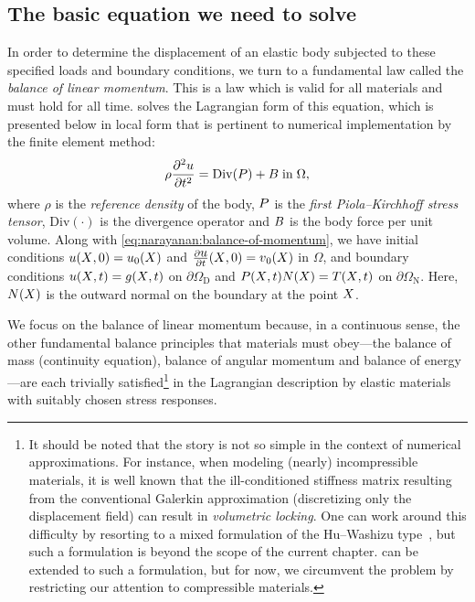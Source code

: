 \subsection{The basic equation we need to solve}

In order to determine the displacement of an elastic body subjected to
these specified loads and boundary conditions, we turn to a
fundamental law called the {\em balance of linear momentum}. This is a
law which is valid for all materials and must hold for all
time. \twist{} solves the Lagrangian form of this equation, which is
presented below in local form that is pertinent to numerical
implementation by the finite element method:
\begin{align}
  \rho \frac{\partial^{2} \mbox{$ u$}}{\partial t^{2}} = \mathrm{Div}(\mbox{$ P$})
  + \mbox{$ B$}\; \mathrm{in}\; \Omega,
  \label{eq:narayanan:balance-of-momentum}
\end{align}
where $\rho$ is the {\em reference density} of the body, $\mbox{$ P$}$ is the
{\em first Piola--Kirchhoff stress tensor}, $\mathrm{Div} (\cdot)$ is
the divergence operator and $\mbox{$ B$}$ is the body force per unit
volume. Along with \eqref{eq:narayanan:balance-of-momentum}, we have
initial conditions $\mbox{$ u$}(\mbox{$ X$}, 0) = \mbox{$ u$}_{0}(\mbox{$ X$})$ and
$\frac{\partial\mbox{$ u$}}{\partial t}(\mbox{$ X$}, 0) = \mbox{$ v$}_{0}(\mbox{$ X$})$ in $\Omega$,
and boundary conditions $\mbox{$ u$}(\mbox{$ X$}, t) = \mbox{$ g$}(\mbox{$ X$}, t)$ on
$\partial\Omega_{\mathrm{D}}$ and $\mbox{$ P$}(\mbox{$ X$}, t) \mbox{$ N$}(\mbox{$ X$}) = \mbox{$ T$}(\mbox{$ X$}, t)$
on $\partial\Omega_{\mathrm{N}}$. Here, $\mbox{$ N$}(X)$ is the outward normal
on the boundary at the point $\mbox{$ X$}$.

We focus on the balance of linear momentum because, in a continuous
sense, the other fundamental balance principles that materials must
obey---the balance of mass (continuity equation), balance of angular
momentum and balance of energy---are each trivially
satisfied\footnote{It should be noted that the story is not
  so simple in the context of numerical approximations. For instance,
  when modeling (nearly) incompressible materials, it is well known
  that the ill-conditioned stiffness matrix resulting from the
  conventional Galerkin approximation (discretizing only the
  displacement field) can result in {\em volumetric locking}. One can
  work around this difficulty by resorting to a mixed formulation of
  the Hu--Washizu type~\citep{SimoHughes1998}, but such a formulation
  is beyond the scope of the current chapter. \twist{} can be extended
  to such a formulation, but for now, we circumvent the problem by
  restricting our attention to compressible materials.} in the
Lagrangian description by elastic materials with suitably chosen
stress responses.

